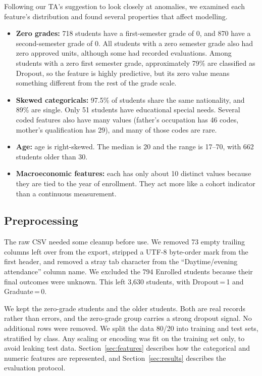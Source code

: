 \documentclass[11pt]{article}
\begin{document}
Following our TA's suggestion to look closely at anomalies, we examined each feature's distribution and found several properties that affect modelling.

\begin{itemize}
  \item \textbf{Zero grades:} 718 students have a first-semester grade of 0, and 870 have a second-semester grade of 0.
    All students with a zero semester grade also had zero approved units, although some had recorded evaluations.
    Among students with a zero first semester grade, approximately 79\% are classified as Dropout, so the feature is highly predictive, but its zero value means something different from the rest of the grade scale.
  \item \textbf{Skewed categoricals:} 97.5\% of students share the same nationality, and 89\% are single.
    Only 51 students have educational special needs.
    Several coded features also have many values (father's occupation has 46 codes, mother's qualification has 29), and many of those codes are rare.
  \item \textbf{Age:} age is right-skewed.
    The median is 20 and the range is 17--70, with 662 students older than 30.
  \item \textbf{Macroeconomic features:} each has only about 10 distinct values because they are tied to the year of enrollment.
    They act more like a cohort indicator than a continuous measurement.
\end{itemize}

\subsection{Preprocessing}

The raw CSV needed some cleanup before use.
We removed 73 empty trailing columns left over from the export, stripped a UTF-8 byte-order mark from the first header, and removed a stray tab character from the ``Daytime/evening attendance'' column name.
We excluded the 794 Enrolled students because their final outcomes were unknown. This left 3,630 students, with Dropout\,=\,1 and Graduate\,=\,0.

We kept the zero-grade students and the older students.
Both are real records rather than errors, and the zero-grade group carries a strong dropout signal.
No additional rows were removed.
We split the data 80/20 into training and test sets, stratified by class.
Any scaling or encoding was fit on the training set only, to avoid leaking test data.
Section~\ref{sec:features} describes how the categorical and numeric features are represented, and Section~\ref{sec:results} describes the evaluation protocol.
\end{document}
